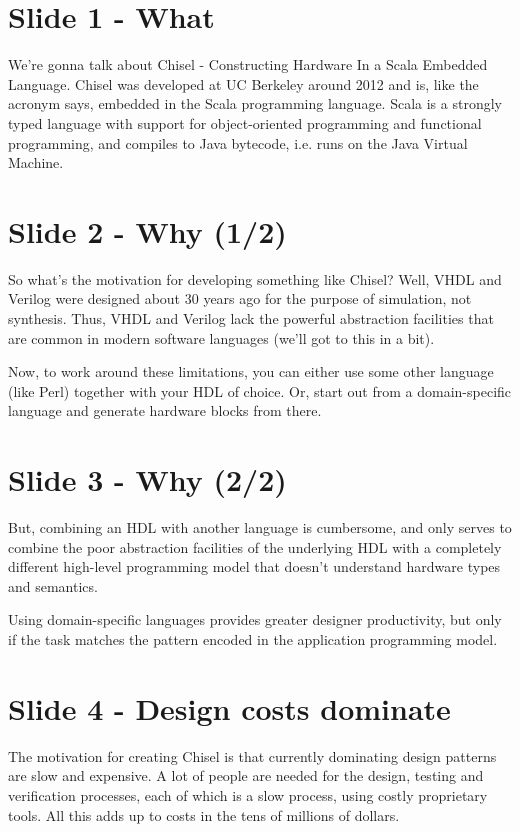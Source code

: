 \documentclass[a4paper,11pt]{article}
\begin{document}
\section{Slide 1 - What}

We're gonna talk about Chisel - Constructing Hardware In a Scala Embedded Language. Chisel was developed at UC Berkeley around 2012 and is, like the acronym says, embedded in the Scala programming language. Scala is a strongly typed language with support for object-oriented programming and functional programming, and compiles to Java bytecode, i.e. runs on the Java Virtual Machine.

\section{Slide 2 - Why (1/2)}

So what's the motivation for developing something like Chisel? Well, VHDL and Verilog were designed about $30$ years ago for the purpose of simulation, not synthesis. Thus, VHDL and Verilog lack the powerful abstraction facilities that are common in modern software languages (we'll got to this in a bit).

Now, to work around these limitations, you can either use some other language (like Perl) together with your HDL of choice. Or, start out from a domain-specific language and generate hardware blocks from there.

\section{Slide 3 - Why (2/2)}

But, combining an HDL with another language is cumbersome, and only serves to combine the poor abstraction facilities of the underlying HDL with a completely different high-level programming model that doesn't understand hardware types and semantics.

Using domain-specific languages provides greater designer productivity, but only if the task matches the pattern encoded in the application programming model.

\section{Slide 4 - Design costs dominate}

The motivation for creating Chisel is that currently dominating design patterns are slow and expensive. A lot of people are needed for the design, testing and verification processes, each of which is a slow process, using costly proprietary tools. All this adds up to costs in the tens of millions of dollars.
\end{document}
